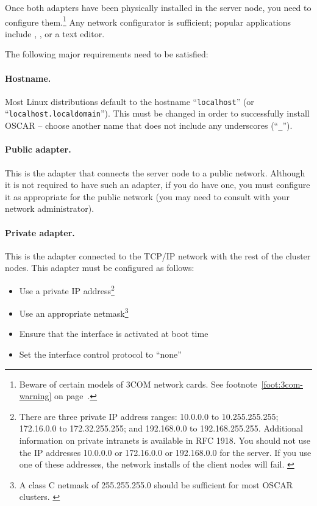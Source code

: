 Once both adapters have been physically installed in the server node,
you need to configure them.\footnote{Beware of certain models of 3COM
  network cards.  See footnote~\ref{foot:3com-warning} on
  page~\pageref{foot:3com-warning}.}  Any network configurator is
sufficient; popular applications include , , or
a text editor.

The following major requirements need to be satisfied:

\paragraph{Hostname.} Most Linux distributions default to the hostname
``{\tt localhost}'' (or ``{\tt localhost.localdomain}'').  This must
be changed in order to successfully install OSCAR -- choose another
name that does not include any underscores (``{\tt \_}'').

\paragraph{Public adapter.}  This is the adapter that connects the
server node to a public network.  Although it is not required to have
such an adapter, if you do have one, you must configure it as
appropriate for the public network (you may need to consult with your
network administrator).

\paragraph{Private adapter.}  This is the adapter connected to
the TCP/IP network with the rest of the cluster nodes.  This adapter
must be configured as follows:

\begin{itemize}
\item Use a private IP address\footnote{There are three private IP
    address ranges: 10.0.0.0 to 10.255.255.255; 172.16.0.0 to
    172.32.255.255; and 192.168.0.0 to 192.168.255.255.  Additional
    information on private intranets is available in RFC 1918.  You
    should not use the IP addresses 10.0.0.0 or 172.16.0.0 or
    192.168.0.0 for the server.  If you use one of these addresses,
    the network installs of the client nodes will fail.
    \label{foot:private-ip-ranges}}

\item Use an appropriate netmask\footnote{A class C netmask of
    255.255.255.0 should be sufficient for most OSCAR clusters.
    \label{foot:netmask}} 

\item Ensure that the interface is activated at boot time

\item Set the interface control protocol to ``none''

\end{itemize}

